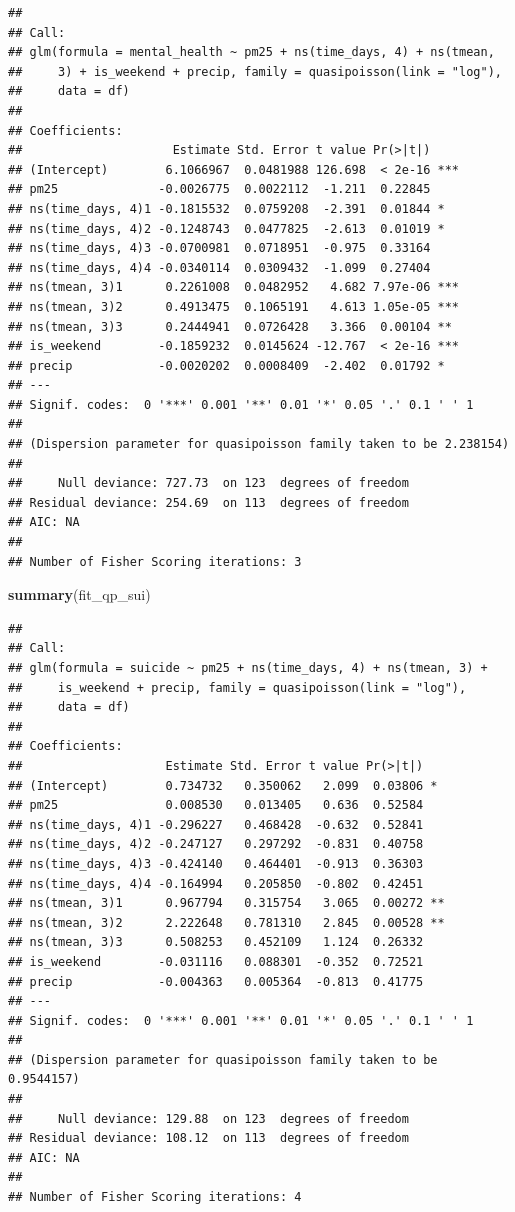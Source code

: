 \documentclass[
]{article}
\newenvironment{Shaded}{\begin{snugshade}}{\end{snugshade}}
\newcommand{\FunctionTok}[1]{\textcolor[rgb]{0.13,0.29,0.53}{\textbf{#1}}}
\newcommand{\NormalTok}[1]{#1}
\begin{document}
\begin{verbatim}
## 
## Call:
## glm(formula = mental_health ~ pm25 + ns(time_days, 4) + ns(tmean, 
##     3) + is_weekend + precip, family = quasipoisson(link = "log"), 
##     data = df)
## 
## Coefficients:
##                     Estimate Std. Error t value Pr(>|t|)    
## (Intercept)        6.1066967  0.0481988 126.698  < 2e-16 ***
## pm25              -0.0026775  0.0022112  -1.211  0.22845    
## ns(time_days, 4)1 -0.1815532  0.0759208  -2.391  0.01844 *  
## ns(time_days, 4)2 -0.1248743  0.0477825  -2.613  0.01019 *  
## ns(time_days, 4)3 -0.0700981  0.0718951  -0.975  0.33164    
## ns(time_days, 4)4 -0.0340114  0.0309432  -1.099  0.27404    
## ns(tmean, 3)1      0.2261008  0.0482952   4.682 7.97e-06 ***
## ns(tmean, 3)2      0.4913475  0.1065191   4.613 1.05e-05 ***
## ns(tmean, 3)3      0.2444941  0.0726428   3.366  0.00104 ** 
## is_weekend        -0.1859232  0.0145624 -12.767  < 2e-16 ***
## precip            -0.0020202  0.0008409  -2.402  0.01792 *  
## ---
## Signif. codes:  0 '***' 0.001 '**' 0.01 '*' 0.05 '.' 0.1 ' ' 1
## 
## (Dispersion parameter for quasipoisson family taken to be 2.238154)
## 
##     Null deviance: 727.73  on 123  degrees of freedom
## Residual deviance: 254.69  on 113  degrees of freedom
## AIC: NA
## 
## Number of Fisher Scoring iterations: 3
\end{verbatim}

\begin{Shaded}
\begin{Highlighting}[]
\FunctionTok{summary}\NormalTok{(fit\_qp\_sui)}
\end{Highlighting}
\end{Shaded}

\begin{verbatim}
## 
## Call:
## glm(formula = suicide ~ pm25 + ns(time_days, 4) + ns(tmean, 3) + 
##     is_weekend + precip, family = quasipoisson(link = "log"), 
##     data = df)
## 
## Coefficients:
##                    Estimate Std. Error t value Pr(>|t|)   
## (Intercept)        0.734732   0.350062   2.099  0.03806 * 
## pm25               0.008530   0.013405   0.636  0.52584   
## ns(time_days, 4)1 -0.296227   0.468428  -0.632  0.52841   
## ns(time_days, 4)2 -0.247127   0.297292  -0.831  0.40758   
## ns(time_days, 4)3 -0.424140   0.464401  -0.913  0.36303   
## ns(time_days, 4)4 -0.164994   0.205850  -0.802  0.42451   
## ns(tmean, 3)1      0.967794   0.315754   3.065  0.00272 **
## ns(tmean, 3)2      2.222648   0.781310   2.845  0.00528 **
## ns(tmean, 3)3      0.508253   0.452109   1.124  0.26332   
## is_weekend        -0.031116   0.088301  -0.352  0.72521   
## precip            -0.004363   0.005364  -0.813  0.41775   
## ---
## Signif. codes:  0 '***' 0.001 '**' 0.01 '*' 0.05 '.' 0.1 ' ' 1
## 
## (Dispersion parameter for quasipoisson family taken to be 0.9544157)
## 
##     Null deviance: 129.88  on 123  degrees of freedom
## Residual deviance: 108.12  on 113  degrees of freedom
## AIC: NA
## 
## Number of Fisher Scoring iterations: 4
\end{verbatim}
\end{document}
